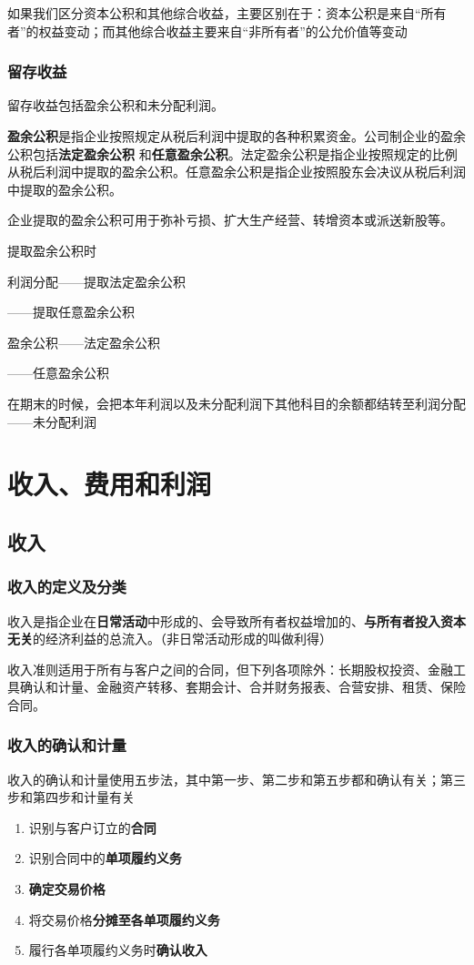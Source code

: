 \documentclass[UTF8,12pt]{ctexart}
\newenvironment{Dr}{%
	\begin{list}{}%
		{
			\setlength{\leftmargin}{2em}
			\setlength{\labelwidth}{2em}
			\setlength{\labelsep}{0pt}
			\setlength{\itemindent}{0pt}
			\setlength{\listparindent}{0pt}
			\setlength{\parsep}{0pt}
			\setlength{\topsep}{0pt}
		}
		\item[\textbf{借：}]
	}{%
	\end{list}
}
\newenvironment{Cr}{%
	\begin{list}{}%
		{
			\setlength{\leftmargin}{3em}
			\setlength{\labelwidth}{2em}
			\setlength{\labelsep}{0pt}
			\setlength{\itemindent}{0pt}
			\setlength{\listparindent}{0pt}
			\setlength{\parsep}{0pt}
			\setlength{\topsep}{0pt}
		}
		\item[\textbf{贷：}]
	}{%
	\end{list}
}
\numberwithin{equation}{section} %
\numberwithin{figure}{section}
\numberwithin{table}{section}
\begin{document}
	如果我们区分资本公积和其他综合收益，主要区别在于：资本公积是来自“所有者”的权益变动；而其他综合收益主要来自“非所有者”的公允价值等变动
	
	\subsubsection{留存收益}
	留存收益包括盈余公积和未分配利润。
	
	\textbf{盈余公积}是指企业按照规定从税后利润中提取的各种积累资金。公司制企业的盈余公积包括\textbf{法定盈余公积} 和\textbf{任意盈余公积}。法定盈余公积是指企业按照规定的比例从税后利润中提取的盈余公积。任意盈余公积是指企业按照股东会决议从税后利润中提取的盈余公积。
	
	企业提取的盈余公积可用于弥补亏损、扩大生产经营、转增资本或派送新股等。
	
	提取盈余公积时
	\begin{Dr}
		利润分配——提取法定盈余公积
		
		——提取任意盈余公积
	\end{Dr}
	\begin{Cr}
		盈余公积——法定盈余公积
		
		——任意盈余公积
	\end{Cr}
	
	在期末的时候，会把本年利润以及未分配利润下其他科目的余额都结转至利润分配——未分配利润
	
	\newpage
	\section{收入、费用和利润}
	\subsection{收入}
	\subsubsection{收入的定义及分类}
	收入是指企业在\textbf{日常活动}中形成的、会导致所有者权益增加的、\textbf{与所有者投入资本无关}的经济利益的总流入。（非日常活动形成的叫做利得）
	
	收入准则适用于所有与客户之间的合同，但下列各项除外：长期股权投资、金融工具确认和计量、金融资产转移、套期会计、合并财务报表、合营安排、租赁、保险合同。
	
	\subsubsection{收入的确认和计量}
	收入的确认和计量使用五步法，其中第一步、第二步和第五步都和确认有关；第三步和第四步和计量有关
	\begin{enumerate}
		\item 识别与客户订立的\textbf{合同}
		
		\item 识别合同中的\textbf{单项履约义务}
		
		\item \textbf{确定交易价格}
		
		\item 将交易价格\textbf{分摊至各单项履约义务}
		
		\item 履行各单项履约义务时\textbf{确认收入}
	\end{enumerate}
	
\end{document}
